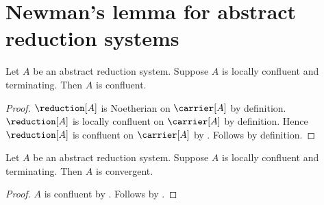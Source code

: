 


\section{Newman's lemma for abstract reduction systems}

\begin{theorem}\label{newman}
    Let $A$ be an abstract reduction system.
    Suppose $A$ is locally confluent and terminating.
    Then $A$ is confluent.
\end{theorem}
\begin{proof}
    $\reduction[A]$ is Noetherian on $\carrier[A]$ by definition.
    $\reduction[A]$ is locally confluent on $\carrier[A]$ by definition.
    Hence $\reduction[A]$ is confluent on $\carrier[A]$
        by .
    Follows by definition.
\end{proof}

\begin{corollary}\label{newman_convergent}
    Let $A$ be an abstract reduction system.
    Suppose $A$ is locally confluent and terminating.
    Then $A$ is convergent.
\end{corollary}
\begin{proof}
    $A$ is confluent by .
    Follows by .
\end{proof}
